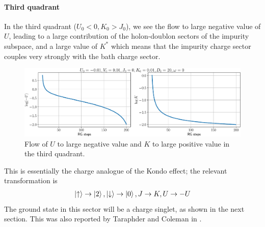 \documentclass[twoside,11pt]{report}
\numberwithin{equation}{section}
\begin{document}
\paragraph*{Third quadrant}
In the third quadrant (\(U_0 < 0, K_0 > J_0\)), we see the flow to large negative value of \(U\), leading to a large contribution of the holon-doublon sectors of the impurity subspace, and a large value of \(K^*\) which means that the impurity charge sector couples very strongly with the bath charge sector.
\begin{figure}[htpb!]
\centering
\includegraphics[width=\textwidth]{../figures/with_V_q3_new.pdf}
\caption{Flow of \(U\) to large negative value and \(K\) to large positive value in the third quadrant.}
\label{frac_q3}
\end{figure}
This is essentially the charge analogue of the Kondo effect; the relevant transformation is
\begin{equation}\begin{aligned}
	\ket{\uparrow} \to \ket{2}, \ket{\downarrow} \to \ket{0}, J \to K, U \to -U
\end{aligned}\end{equation}
The ground state in this sector will be a charge singlet, as shown in the next section. This was also reported by Taraphder and Coleman in \cite{taraphder}.
\end{document}
